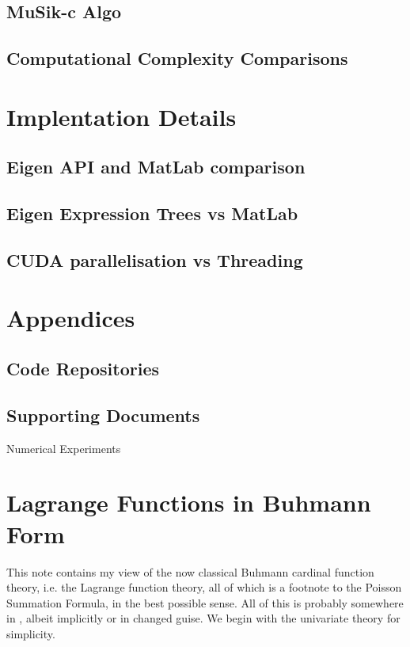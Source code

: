 \documentclass[a4paper]{amsart}
\begin{document}
\subsection{MuSik-c Algo}

\subsection{Computational Complexity Comparisons}

 

\section{Implentation Details}

\subsection{Eigen API and MatLab comparison}

\subsection{Eigen Expression Trees vs MatLab}

\subsection{CUDA parallelisation vs Threading}


\section{Appendices}

\subsection{Code Repositories}

\subsection{Supporting Documents}
 

Numerical Experiments

\section{Lagrange Functions in Buhmann Form}
This note contains my view of the now classical Buhmann cardinal
function theory, i.e. the Lagrange function theory, all of which is
a footnote to the Poisson Summation Formula, in the best possible
sense. All of this is probably somewhere in \cite{mdb}, albeit
implicitly or in changed guise. We begin with the univariate theory
for simplicity.
\end{document}
